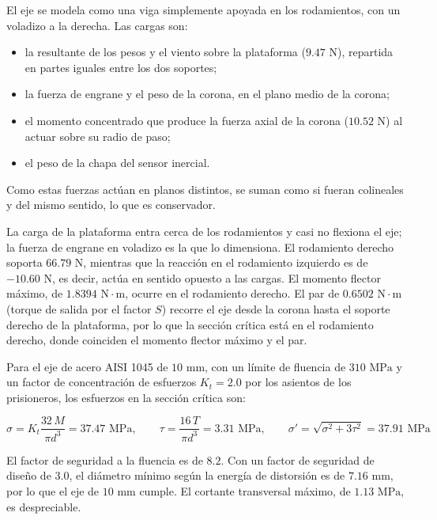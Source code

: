\documentclass[../../General.tex]{subfiles}
\begin{document}
El eje se modela como una viga simplemente apoyada en los rodamientos, con un voladizo a la derecha. Las cargas son:
\begin{itemize}
    \item la resultante de los pesos y el viento sobre la plataforma ($9.47\text{ N}$), repartida en partes iguales entre los dos soportes;
    \item la fuerza de engrane y el peso de la corona, en el plano medio de la corona;
    \item el momento concentrado que produce la fuerza axial de la corona ($10.52\text{ N}$) al actuar sobre su radio de paso;
    \item el peso de la chapa del sensor inercial.
\end{itemize}
Como estas fuerzas actúan en planos distintos, se suman como si fueran colineales y del mismo sentido, lo que es conservador.

La carga de la plataforma entra cerca de los rodamientos y casi no flexiona el eje; la fuerza de engrane en voladizo es la que lo dimensiona. El rodamiento derecho soporta $66.79\text{ N}$, mientras que la reacción en el rodamiento izquierdo es de $-10.60\text{ N}$, es decir, actúa en sentido opuesto a las cargas. El momento flector máximo, de $1.8394\text{ N}\cdot\text{m}$, ocurre en el rodamiento derecho. El par de $0.6502\text{ N}\cdot\text{m}$ (torque de salida por el factor $S$) recorre el eje desde la corona hasta el soporte derecho de la plataforma, por lo que la sección crítica está en el rodamiento derecho, donde coinciden el momento flector máximo y el par.

Para el eje de acero AISI 1045 de $10\text{ mm}$, con un límite de fluencia de $310\text{ MPa}$ \citep{asm2002steels} y un factor de concentración de esfuerzos $K_t = 2.0$ por los asientos de los prisioneros, los esfuerzos en la sección crítica son:

\begin{equation}\label{eq:esfuerzos_eje_tilt}
    \sigma = K_t \frac{32\, M}{\pi d^3} = 37.47\text{ MPa}, \qquad
    \tau = \frac{16\, T}{\pi d^3} = 3.31\text{ MPa}, \qquad
    \sigma' = \sqrt{\sigma^2 + 3\tau^2} = 37.91\text{ MPa}
\end{equation}

El factor de seguridad a la fluencia es de $8.2$. Con un factor de seguridad de diseño de $3.0$, el diámetro mínimo según la energía de distorsión es de $7.16\text{ mm}$, por lo que el eje de $10\text{ mm}$ cumple. El cortante transversal máximo, de $1.13\text{ MPa}$, es despreciable.
\end{document}
